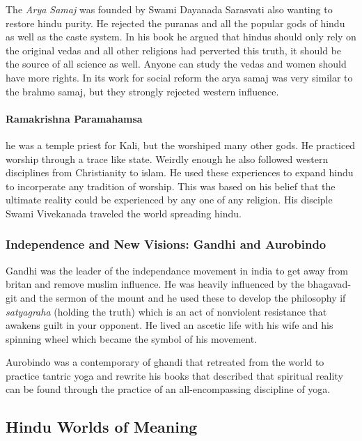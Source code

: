 \documentclass{article}
\begin{document}
The \emph{Arya Samaj} was founded by Swami Dayanada Sarasvati also wanting to restore hindu purity. He rejected the puranas and all the popular gods of hindu as well as the caste system. In his book he argued that hindus should only rely on the original vedas and all other religions had perverted this truth, it should be the source of all science as well. Anyone can study the vedas and women should have more rights. In its work for social reform the arya samaj was very similar to the brahmo samaj, but they strongly rejected western influence.

\paragraph{Ramakrishna Paramahamsa}
\label{par:ramakrishna_paramahamsa}
he was a temple priest for Kali, but the worshiped many other gods. He practiced worship through a trace like state. Weirdly enough he also followed western disciplines from Christianity to islam. He used these experiences to expand hindu to incorperate any tradition of worship. This was based on his belief that the ultimate reality could be experienced by any one of any religion. His disciple Swami Vivekanada traveled the world spreading hindu.

\subsubsection*{Independence and New Visions: Gandhi and Aurobindo}
\label{ssub:independence_and_new_visions_gandhi_and_aurobindo}
Gandhi was the leader of the independance movement in india to get away from britan and remove muslim influence. He was heavily influenced by the bhagavad-git and the sermon of the mount and he used these to develop the philosophy if \emph{satyagraha} (holding the truth) which is an act of nonviolent resistance that awakens guilt in your opponent. He lived an ascetic life with his wife and his spinning wheel which became the symbol of his movement.

Aurobindo was a contemporary of ghandi that retreated from the world to practice tantric yoga and rewrite his books that described that spiritual reality can be found through the practice of an all-encompassing discipline of yoga.

\subsection*{Hindu Worlds of Meaning}
\label{sec:hindu_worlds_of_meaning}
\end{document}
